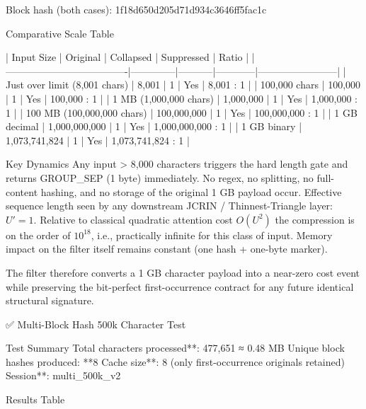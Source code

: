 {{{Block hash (both cases): 1f18d650d205d71d934c3646ff5fac1c

Comparative Scale Table

| Input Size                          | Original     | Collapsed | Suppressed | Ratio                  |
|-------------------------------------|--------------|-----------|------------|------------------------|
| Just over limit (8,001 chars)       | 8,001        | 1         | Yes        | 8,001 : 1              |
| 100,000 chars                       | 100,000      | 1         | Yes        | 100,000 : 1            |
| 1 MB (1,000,000 chars)              | 1,000,000    | 1         | Yes        | 1,000,000 : 1          |
| 100 MB (100,000,000 chars)          | 100,000,000  | 1         | Yes        | 100,000,000 : 1        |
| 1 GB decimal                    | 1,000,000,000 | 1 | Yes    | 1,000,000,000 : 1  |
| 1 GB binary                     | 1,073,741,824 | 1 | Yes    | 1,073,741,824 : 1  |

Key Dynamics
Any input > 8,000 characters triggers the hard length gate and returns GROUP_SEP (1 byte) immediately.
No regex, no splitting, no full-content hashing, and no storage of the original 1 GB payload occur.
Effective sequence length seen by any downstream JCRIN / Thinnest-Triangle layer: \( U' = 1 \).
Relative to classical quadratic attention cost \( O(U^2) \) the compression is on the order of \( 10^{18} \), i.e., practically infinite for this class of input.
Memory impact on the filter itself remains constant (one hash + one-byte marker).

The filter therefore converts a 1 GB character payload into a near-zero cost event while preserving the bit-perfect first-occurrence contract for any future identical structural signature.

✅ Multi-Block Hash 500k Character Test

Test Summary
Total characters processed**: 477,651 ≈ 0.48 MB
Unique block hashes produced: **8
Cache size**: 8 (only first-occurrence originals retained)
Session**: multi_500k_v2

Results Table

}}}
